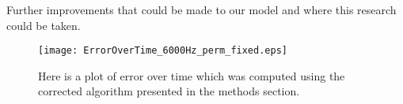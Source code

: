 Further improvements that could be made to our model and where this research could be taken.

\begin{figure}[H]
\centering
\texttt{[image: ErrorOverTime\_6000Hz\_perm\_fixed.eps]}
\caption{Here is a plot of error over time which was computed using the corrected algorithm presented in the methods section.}
\label{EoT: fixed}
\end{figure}